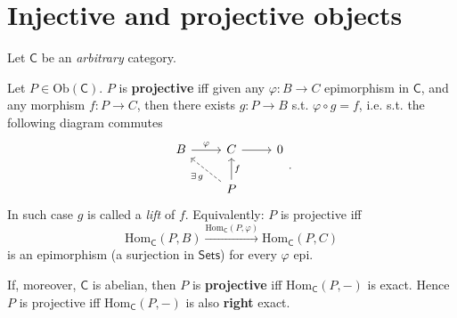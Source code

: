 \section{Injective and projective objects}
Let $\mathsf{C}$ be an \textit{arbitrary} category.

\begin{defn}
	Let $P \in \mathrm{Ob} \left(\mathsf{C}\right)$.
	$P$ is \textbf{projective} iff given any $\varphi: B \to C$ epimorphism in $\mathsf{C}$, 
	and any morphism $f: P \to C$, then there exists $g: P \to B$ s.t. $\varphi \circ g = f$, 
	i.e. s.t. the following diagram commutes
	\begin{equation}
	\begin{tikzcd}
		B \arrow[r, "\varphi", rightarrow] &
		C \arrow[r, "", rightarrow] &
		0 \\
		&
		P \arrow[lu, "\exists\, g", dashrightarrow] \arrow[u, "f"', rightarrow]  &
	\end{tikzcd}
	.\end{equation} 
	In such case $g$ is called a \textit{lift} of $f$.\newline
	Equivalently:
	$P$ is projective iff
	\begin{equation}
	\mathrm{Hom}_{\mathsf{C}} \left( P, B \right) \xrightarrow{\mathrm{Hom}_{\mathsf{C}} \left( P, \varphi \right)} 
	\mathrm{Hom}_{\mathsf{C}} \left( P, C \right)
	\end{equation} 
	is an epimorphism (a surjection in $\mathsf{Sets}$) for every $\varphi$ epi.
\end{defn}

\begin{rem}
	If, moreover, $\mathsf{C}$ is abelian, then
	$P$ is \textbf{projective} iff $\mathrm{Hom}_{\mathsf{C}} \left( P, - \right)$ is exact.
	Hence $P$ is projective iff $\mathrm{Hom}_{\mathsf{C}} \left( P, -\right)$ is also \textbf{right} exact.
\end{rem}

